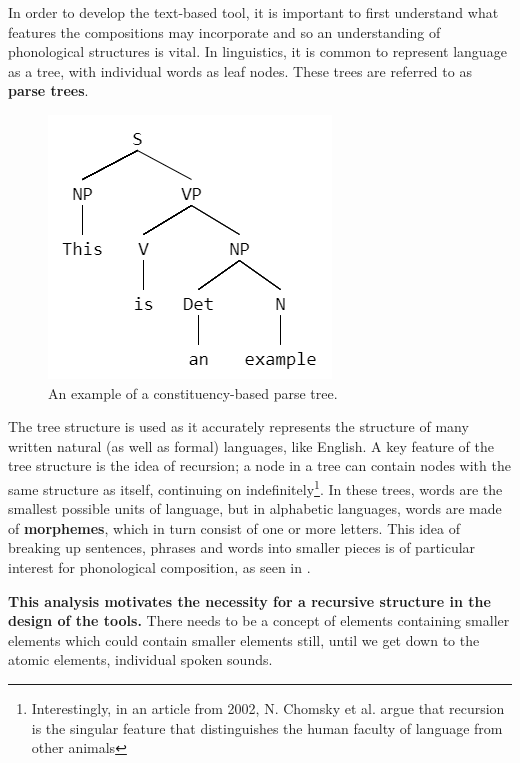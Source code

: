 \documentclass[12pt,a4paper,oneside,openright]{report}
\begin{document}
In order to develop the text-based tool, it is important to first understand what features the compositions may incorporate and so an understanding of phonological structures is vital. In linguistics, it is common to represent language as a tree, with individual words as leaf nodes. These trees are referred to as \textbf{parse trees}.
\begin{figure}[h]
    \centering
    \includegraphics[scale=0.5]{images/parse_tree.png}
    \caption{An example of a constituency-based parse tree.}
    \label{fig:parse_tree}
\end{figure}

The tree structure is used as it accurately represents the structure of many written natural (as well as formal) languages, like English. A key feature of the tree structure is the idea of recursion; a node in a tree can contain nodes with the same structure as itself, continuing on indefinitely\footnote{Interestingly, in an article from 2002, N. Chomsky et al. \cite{Hauser02} argue that recursion is the singular feature that distinguishes the human faculty of language from other animals }. In these trees, words are the smallest possible units of language, but in alphabetic languages, words are made of \textbf{morphemes}, which in turn consist of one or more letters. This idea of breaking up sentences, phrases and words into smaller pieces is of particular interest for phonological composition, as seen in .

\textbf{This analysis motivates the necessity for a recursive structure in the design of the tools.} There needs to be a concept of elements containing smaller elements which could contain smaller elements still, until we get down to the atomic elements, individual spoken sounds.
\end{document}
